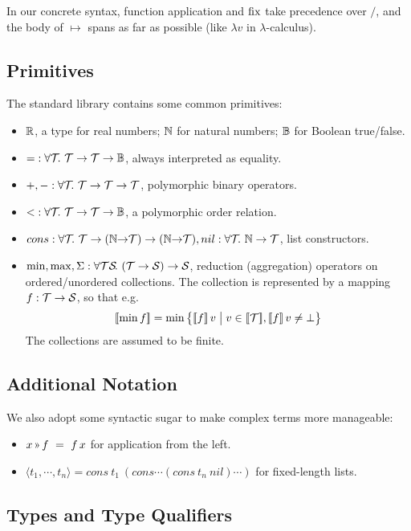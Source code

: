 In our concrete syntax, function application and $\operatorname{fix}$ take precedence over $/$,
and the body of $\mapsto$ spans as far as possible (like $\lambda v$ in $\lambda$-calculus).

\subsection{Primitives}

The standard library contains some common primitives:

\newcommand\forallT{\forall\T\!.~}
\newcommand\forallTS{\forall\T\S\!.~}


\begin{itemize}
  \item $\mathbb{R}$, a type for real numbers; $\mathbb{N}$ for natural numbers; $\mathbb{B}$ for Boolean true/false.
  \item ${=} : \forallT \T\to\T\to\B$, always interpreted as equality.
  \item ${+}, {-} : \forallT \T\to\T\to\T$, polymorphic binary operators.
  \item ${<} : \forallT \T\to\T\to\B$, a polymorphic order relation.
  \item $cons : \forallT \T\to(\N{\to}\T)\to(\N{\to}\T), nil : \forallT \N\to\T$, list constructors.
  \item $\min, \max, \Sigma : \forallTS (\T\to\S)\to\S$, reduction (aggregation) operators
    on ordered/unordered collections. The collection is represented by a mapping $f : \mathcal{T}\to\mathcal{S}$,
    so that e.g. \[\semp{\min f} = \min \big\{\semp{f}\,v \;\big|\; v\in\semp{\T}, \semp{f}\,v\neq\bot\big\}\]
    The collections are assumed to be finite.
\end{itemize}

\subsection{Additional Notation}

We also adopt some syntactic sugar to make complex terms more manageable:

\begin{itemize}
  \item $x \applt f ~=~ f\,x$ for application from the left.
  \item $\langle t_1,\cdots,t_n\rangle = cons~t_1 ~ (cons \cdots (cons~t_n ~ nil) \cdots)$
    for fixed-length lists.
\end{itemize}

\subsection{Types and Type Qualifiers}
\label{lang:types}

